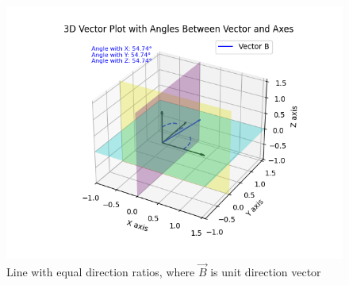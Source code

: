 \documentclass[journal]{IEEEtran}
\begin{document}
\begin{figure}[h!]
   \centering
   \includegraphics[width=0.7\linewidth]{figs/fig.png}
   \caption{Line with equal direction ratios, where $\vec{B}$ is unit direction vector}
\end{figure}
\end{document}
